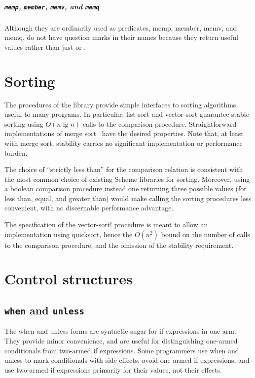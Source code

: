 \documentclass[twoside,twocolumn]{algol60}
\begin{document}
\paragraph{{\tt memp}, {\tt member}, {\tt memv}, and {\tt memq}}

Although they are ordinarily used as predicates, {\cf memp}, {\cf
  member}, {\cf memv}, and {\cf memq}, do not have question marks in
their names because they return useful values rather than just
\schtrue{} or \schfalse{}.

\chapter{Sorting}

The procedures of the  library provide simple
interfaces to sorting algorithms useful to many programs.  In
particular, {\cf list-sort} and {\cf vector-sort} guarantee stable
sorting using $O(n \lg n)$ calls to the comparison procedure.
Straightforward implementations of merge sort~\cite{algorithms} have
the desired properties.  Note that, at least with merge sort,
stability carries no significant implementation or performance burden.

The choice of ``strictly less than'' for the comparison relation is
consistent with the most common choice of existing Scheme libraries
for sorting.  Moreover, using a boolean comparison procedure instead
one returning three possible values (for less than, equal, and greater
than) would make calling the sorting procedures less convenient, with
no discernable performance advantage.

The specification of the {\cf vector-sort!} procedure is meant to
allow an implementation using {\cf quicksort}, hence the $O(n^2)$
bound on the number of calls to the comparison procedure, and the
omission of the stability requirement.

\chapter{Control structures}

\section{{\tt when} and {\tt unless}}

The {\cf when} and {\cf unless} forms are syntactic sugar for {\cf if}
expressions in one arm.  They provide minor convenience, and are
useful for distinguishing one-armed conditionals from two-armed {\cf
  if} expressions.  Some programmers use {\cf when} and {\cf unless}
to mark conditionals with side effects, avoid one-armed {\cf if}
expressions, and use two-armed {\cf if} expressions primarily for
their values, not their effects.
\end{document}
